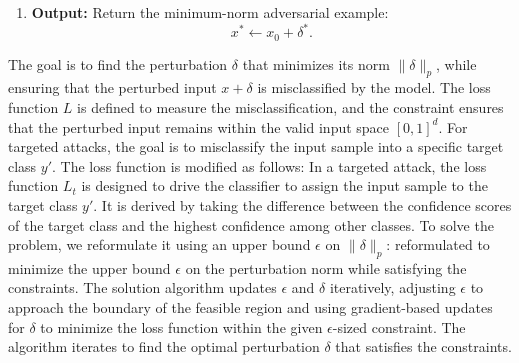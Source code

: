 \begin{enumerate}
    \item \textbf{Output:}  
    Return the minimum-norm adversarial example:
    \[
    x^* \leftarrow x_0 + \delta^*.
    \]
\end{enumerate}

The goal is to find the perturbation $\delta$ that minimizes its norm $\|\delta\|_p$, while ensuring that the perturbed input $x + \delta$ is misclassified by the model. The loss function $L$ is defined to measure the misclassification, and the constraint ensures that the perturbed input remains within the valid input space $[0, 1]^d$.
For targeted attacks, the goal is to misclassify the input sample into a specific target class $y'$. The loss function is modified as follows:
In a targeted attack, the loss function $L_t$ is designed to drive the classifier to assign the input sample to the target class $y'$. It is derived by taking the difference between the confidence scores of the target class and the highest confidence among other classes.
To solve the problem, we reformulate it using an upper bound $\epsilon$ on $\|\delta\|_p$:
reformulated to minimize the upper bound $\epsilon$ on the perturbation norm while satisfying the constraints. The solution algorithm updates $\epsilon$ and $\delta$ iteratively, adjusting $\epsilon$ to approach the boundary of the feasible region and using gradient-based updates for $\delta$ to minimize the loss function within the given $\epsilon$-sized constraint. The algorithm iterates to find the optimal perturbation $\delta$ that satisfies the constraints.